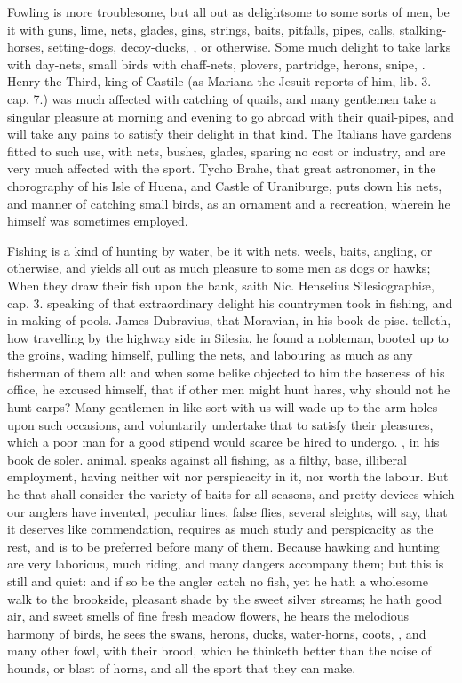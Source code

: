 {Fowling is more troublesome, but all out as delightsome to some sorts
of men, be it with guns, lime, nets, glades, gins, strings, baits,
pitfalls, pipes, calls, stalking-horses, setting-dogs, decoy-ducks,
\etc{}, or otherwise. Some much delight to take larks with day-nets, small
birds with chaff-nets, plovers, partridge, herons, snipe, \etc{}. Henry the
Third, king of Castile (as Mariana the Jesuit reports of him, lib. 3.
cap. 7.) was much affected with catching of quails, and many
gentlemen take a singular pleasure at morning and evening to go abroad
with their quail-pipes, and will take any pains to satisfy their
delight in that kind. The Italians have gardens fitted to such
use, with nets, bushes, glades, sparing no cost or industry, and are
very much affected with the sport. Tycho Brahe, that great astronomer,
in the chorography of his Isle of Huena, and Castle of Uraniburge, puts
down his nets, and manner of catching small birds, as an ornament and a
recreation, wherein he himself was sometimes employed.

Fishing is a kind of hunting by water, be it with nets, weels, baits,
angling, or otherwise, and yields all out as much pleasure to some men
as dogs or hawks; When they draw their fish upon the bank, saith
Nic. Henselius Silesiographi\ae{}, cap. 3. speaking of that extraordinary
delight his countrymen took in fishing, and in making of pools. James
Dubravius, that Moravian, in his book de pisc. telleth, how travelling
by the highway side in Silesia, he found a nobleman, booted up to
the groins, wading himself, pulling the nets, and labouring as much as
any fisherman of them all: and when some belike objected to him the
baseness of his office, he excused himself, that if other men
might hunt hares, why should not he hunt carps? Many gentlemen in like
sort with us will wade up to the arm-holes upon such occasions, and
voluntarily undertake that to satisfy their pleasures, which a poor man
for a good stipend would scarce be hired to undergo. \Plutarch, in his
book de soler. animal. speaks against all fishing, as a filthy,
base, illiberal employment, having neither wit nor perspicacity in it,
nor worth the labour. But he that shall consider the variety of baits
for all seasons, and pretty devices which our anglers have invented,
peculiar lines, false flies, several sleights, \etc{} will say, that it
deserves like commendation, requires as much study and perspicacity as
the rest, and is to be preferred before many of them. Because hawking
and hunting are very laborious, much riding, and many dangers accompany
them; but this is still and quiet: and if so be the angler catch no
fish, yet he hath a wholesome walk to the brookside, pleasant shade by
the sweet silver streams; he hath good air, and sweet smells of fine
fresh meadow flowers, he hears the melodious harmony of birds, he sees
the swans, herons, ducks, water-horns, coots, \etc{}, and many other fowl,
with their brood, which he thinketh better than the noise of hounds, or
blast of horns, and all the sport that they can make.

}
